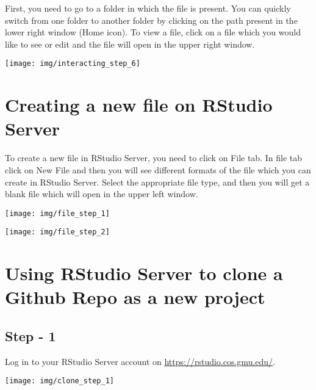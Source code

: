 \documentclass[
]{book}
\begin{document}
First, you need to go to a folder in which the file is present. You can quickly switch from one folder to another folder by clicking on the path present in the lower right window (Home icon). To view a file, click on a file which you would like to see or edit and the file will open in the upper right window.

\begin{center}\texttt{[image: img/interacting\_step\_6]} \end{center}

\hypertarget{creating-a-new-file-on-rstudio-server}{%
\section{Creating a new file on RStudio Server}\label{creating-a-new-file-on-rstudio-server}}

To create a new file in RStudio Server, you need to click on File tab. In file tab click on New File and then you will see different formats of the file which you can create in RStudio Server. Select the appropriate file type, and then you will get a blank file which will open in the upper left window.

\begin{center}\texttt{[image: img/file\_step\_1]} \end{center}

\begin{center}\texttt{[image: img/file\_step\_2]} \end{center}

\hypertarget{using-rstudio-server-to-clone-a-github-repo-as-a-new-project}{%
\section{Using RStudio Server to clone a Github Repo as a new project}\label{using-rstudio-server-to-clone-a-github-repo-as-a-new-project}}

\hypertarget{step---1}{%
\subsection{Step - 1}\label{step---1}}

Log in to your RStudio Server account on \url{https://rstudio.cos.gmu.edu/}.

\begin{center}\texttt{[image: img/clone\_step\_1]} \end{center}
\end{document}
